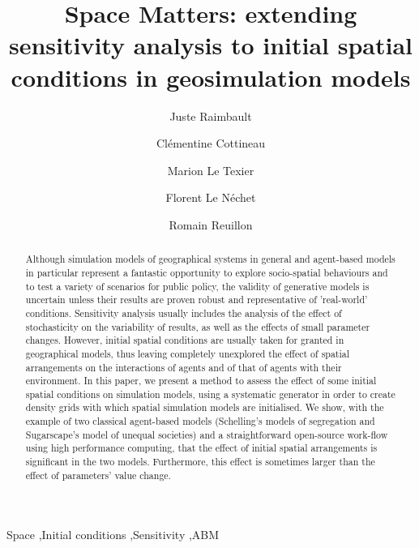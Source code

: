 \documentclass[preprint,5p,times,twocolumn,authoryear]{elsarticle}
\begin{document}
\begin{frontmatter}

\title{Space Matters: extending sensitivity analysis to initial spatial conditions in geosimulation models}

\author[a,b]{Juste Raimbault}
\author[c,d]{Cl{\' e}mentine Cottineau}
\author[e]{Marion Le Texier}
\author[f]{Florent Le N{\' e}chet}
\author[a]{Romain Reuillon}

\address[a]{UPS CNRS 3611 ISC-PIF, Paris, France}
\address[b]{UMR CNRS 8504 G{\'e}ographie-cit{\'e}s, Paris, France}
\address[c]{Centre for Advanced Spatial Analysis, University College London, UK}
\address[d]{UMR CNRS 8097 Centre Maurice Halbwachs, Paris, France}
\address[e]{UMR 6266 IDEES, Universit{\'e} de Rouen Normandie, France}
\address[f]{Universit{\'e} Paris-Est, Laboratoire Ville Mobilité Transport, Marne-la-Vallée, France}





\begin{abstract}
Although simulation models of geographical systems in general and agent-based models in particular represent a fantastic opportunity to explore socio-spatial behaviours and to test a variety of scenarios for public policy, the validity of generative models is uncertain unless their results are proven robust and representative of 'real-world' conditions. Sensitivity analysis usually includes the analysis of the effect of stochasticity on the variability of results, as well as the effects of small parameter changes. However, initial spatial conditions are usually taken for granted in geographical models, thus leaving completely unexplored the effect of spatial arrangements on the interactions of agents and of that of agents with their environment. In this paper, we present a method to assess the effect of some initial spatial conditions on simulation models, using a systematic  generator  in order to create density grids with which spatial simulation models are initialised. We show, with the example of two classical agent-based models (Schelling's models of segregation and Sugarscape's model of unequal societies) and a straightforward open-source work-flow using high performance computing, that the effect of initial spatial arrangements is significant in the two models. Furthermore, this effect is sometimes larger than the effect of parameters' value change. 
\end{abstract}

\begin{keyword}
Space \sep Initial conditions \sep Sensitivity \sep ABM
\end{keyword}

\end{frontmatter}
\end{document}
